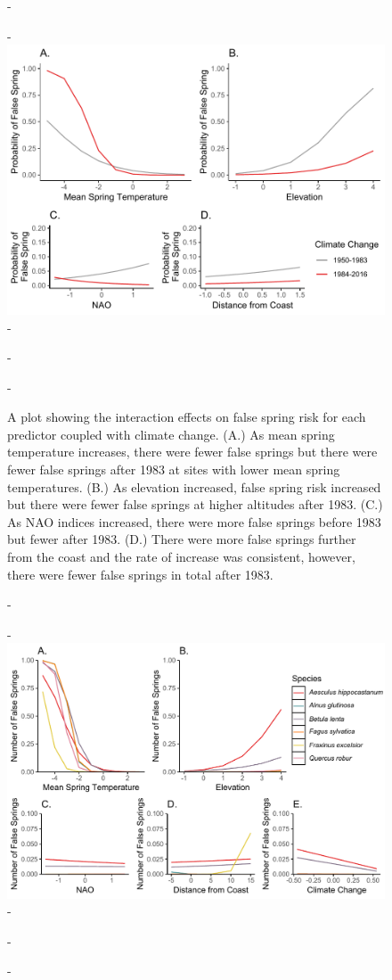 \documentclass{article}\usepackage[]{graphicx}\usepackage[]{color}
\begin{document}
{\begin{figure} [H]
  -\begin{center}
  -\includegraphics[width=16cm]{..//figures/InteractionPlots/IntrxnPlots_bernie.pdf}
  -\caption{A plot showing the interaction effects on false spring risk for each predictor coupled with climate change. (A.) As mean spring temperature increases, there were fewer false springs but there were fewer false springs after 1983 at sites with lower mean spring temperatures. (B.) As elevation increased, false spring risk increased but there were fewer false springs at higher altitudes after 1983. (C.) As NAO indices increased, there were more false springs before 1983 but fewer after 1983. (D.) There were more false springs further from the coast and the rate of increase was consistent, however, there were fewer false springs in total after 1983.}\label{fig:intrxns}
  -\end{center}
  -\end{figure}}
  
{\begin{figure} [H]
  -\begin{center}
  -\includegraphics[width=16cm]{..//figures/InteractionPlots/Species_bernie.pdf}
  -\caption{}\label{fig:spp}
  -\end{center}
  -\end{figure}}

  
\end{document}
